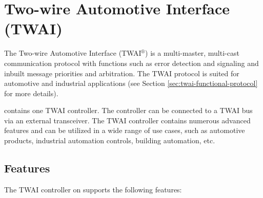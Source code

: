 \documentclass[main\_\_EN.tex]{subfiles}
\begin{document}

\ifglobal
\else
    {\let\clearpage\relax \listoftodos}
    \tableofcontents
    \listoftables
    \listoffigures
\fi



\hypertarget{twai}{}
\chapter{Two-wire Automotive Interface (TWAI)}
\label{mod:twai}


The Two-wire Automotive Interface (TWAI$^\circledR$) is a multi-master, multi-cast communication protocol with functions such as error detection and signaling and inbuilt message priorities and arbitration. The TWAI protocol is suited for automotive and industrial applications (see Section \ref{sec:twai-functional-protocol} for more details).

\chipname{} contains one TWAI controller. The controller can be connected to a TWAI bus via an external transceiver. The TWAI controller contains numerous advanced features and can be utilized in a wide range of use cases, such as automotive products, industrial automation controls, building automation, etc.

\section{Features}
The TWAI controller on \chipname{} supports the following features:
\end{document}
